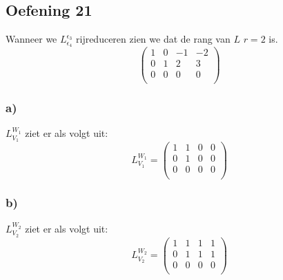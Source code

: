 \documentclass[lineaire_algebra_oplossingen.tex]{subfiles}
\begin{document}
\subsection{Oefening 21}
Wanneer we $L_{\epsilon_{4}}^{\epsilon_{3}}$ rijreduceren zien we dat de rang van $L$ $r=2$ is.
\[
\begin{pmatrix}
1 & 0 & -1 & -2\\
0 & 1 & 2 & 3\\
0 & 0 & 0 & 0\\
\end{pmatrix}
\]
\subsubsection*{a)}
$L_{V_{1}}^{W_{1}}$ ziet er als volgt uit:
\[
L_{V_{1}}^{W_{1}} = 
\begin{pmatrix}
1 & 1 & 0 & 0\\
0 & 1 & 0 & 0\\
0 & 0 & 0 & 0\\
\end{pmatrix}
\]

\subsubsection*{b)}
$L_{V_{2}}^{W_{2}}$ ziet er als volgt uit:
\[
L_{V_{2}}^{W_{2}} = 
\begin{pmatrix}
1 & 1 & 1 & 1\\
0 & 1 & 1 & 1\\
0 & 0 & 0 & 0\\
\end{pmatrix}
\]
\end{document}
